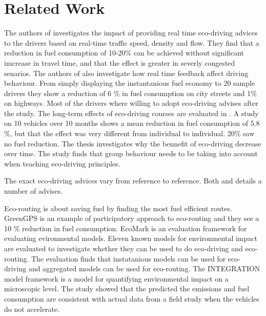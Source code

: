 \section{Related Work}

The authors of \cite{EcodriveEnergy} investigates the impact of providing real time eco-driving advices to the drivers based on real-time traffic speed, density and flow. 
They find that a reduction in fuel consumption of 10-20\% can be achieved without significant imcrease in travel time, and that the effect is greater in severly congested senarios. 
The authors of \cite{EvalEcoDriving} also investigate how real time feedback affect driving behaviour. 
From simply displaying the instantanious fuel economy to 20 sample drivers they show a reduction of 6 \% in fuel consumption on city streets and 1\% on highways. 
Most of the drivers where willing to adopt eco-driving advises after the study.
The long-term effects of eco-driving courses are evaluated in \cite{Beusen}.
A study on 10 vehicles over 10 months shows a mean reduction in fuel consumption of 5.8 \%, but that the effect was very different from individual to individual. 20\% saw no fuel reduction. 
The thesis \cite{TruckDriver} investigates why the bennefit of eco-driving decrease over time.
The study finds that group behaviour needs to be taking into account when teaching eco-driving principles. 

The exact eco-driving advices vary from reference to reference.
Both \cite{EcodrivingAdvice} and \cite{KorGront} details a number of advises.

Eco-routing is about saving fuel by finding the most fuel efficient routes. 
GreenGPS \cite{GreenGPS} is an example of participatory approach to eco-routing and they see a 10 \% reduction in fuel consumption.
EcoMark \cite{EcoMark} is an evaluation framework for evaluating evironmental models. 
Eleven known models for environmental impact are evaluated to investigate whether they can be used to do eco-driving and eco-routing.
The evaluation finds that instatanious models can be used for eco-driving and aggregated models can be used for eco-routing.
The INTEGRATION model framework \cite{IMF} is a model for quantifying environmental impact on a microscopic level.
The study showed that the predicted the emissions and fuel consumption are consistent with actual data from a field study when the vehicles do not accelerate. %

